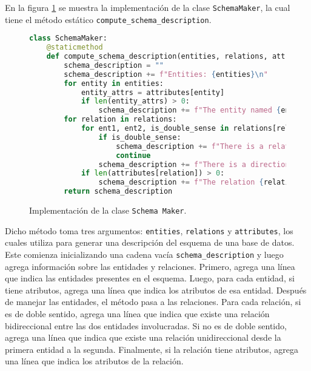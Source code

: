 En la figura \ref{code:schemamaker} se muestra la implementación de la clase \texttt{SchemaMaker}, la cual tiene el método estático \texttt{compute\_schema\_description}. 

\begin{figure}[H]
\begin{lstlisting}[language=python]
class SchemaMaker:    
    @staticmethod
    def compute_schema_description(entities, relations, attributes):
        schema_description = ""
        schema_description += f"Entities: {entities}\n"
        for entity in entities:
            entity_attrs = attributes[entity]
            if len(entity_attrs) > 0:
                schema_description += f"The entity named {entity} has the attributes: {[attr[0] for attr in entity_attrs]}\n"
        for relation in relations:
            for ent1, ent2, is_double_sense in relations[relation]: 
                if is_double_sense:
                    schema_description += f"There is a relation called {relation} between the entitites {ent1} and {ent2}. The relation {relation} can be used in both senses.\n"
                    continue
                schema_description += f"There is a directional relation called {relation} that has only direction from {ent1} to {ent2}.\n"
            if len(attributes[relation]) > 0:
                schema_description += f"The relation {relation} has attributes {attributes[relation]}\n"
        return schema_description
\end{lstlisting}
\caption{Implementación de la clase \texttt{Schema Maker}.}
\label{code:schemamaker}
\end{figure}

Dicho método toma tres argumentos: \texttt{entities}, \texttt{relations} y \texttt{attributes}, los cuales utiliza para generar una descripción del esquema de una base de datos. Este comienza inicializando una cadena vacía \texttt{schema\_description} y luego agrega información sobre las entidades y relaciones. Primero, agrega una línea que indica las entidades presentes en el esquema. Luego, para cada entidad, si tiene atributos, agrega una línea que indica los atributos de esa entidad. Después de manejar las entidades, el método pasa a las relaciones. Para cada relación, si es de doble sentido, agrega una línea que indica que existe una relación bidireccional entre las dos entidades involucradas. Si no es de doble sentido, agrega una línea que indica que existe una relación unidireccional desde la primera entidad a la segunda. Finalmente, si la relación tiene atributos, agrega una línea que indica los atributos de la relación.

